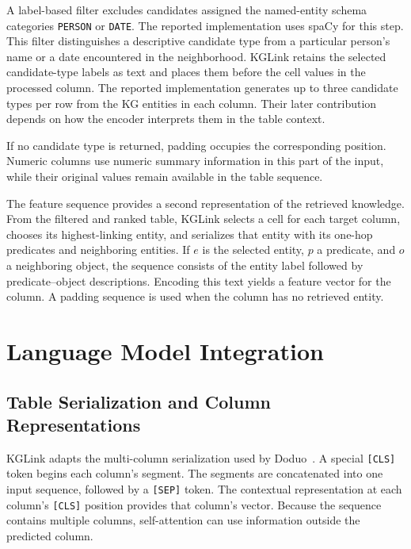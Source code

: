 A label-based filter excludes candidates assigned the named-entity schema categories \texttt{PERSON} or \texttt{DATE}. The reported implementation uses spaCy for this step. This filter distinguishes a descriptive candidate type from a particular person's name or a date encountered in the neighborhood. KGLink retains the selected candidate-type labels as text and places them before the cell values in the processed column. The reported implementation generates up to three candidate types per row from the KG entities in each column. Their later contribution depends on how the encoder interprets them in the table context.

If no candidate type is returned, padding occupies the corresponding position. Numeric columns use numeric summary information in this part of the input, while their original values remain available in the table sequence.

The feature sequence provides a second representation of the retrieved knowledge. From the filtered and ranked table, KGLink selects a cell for each target column, chooses its highest-linking entity, and serializes that entity with its one-hop predicates and neighboring entities. If $e$ is the selected entity, $p$ a predicate, and $o$ a neighboring object, the sequence consists of the entity label followed by predicate--object descriptions. Encoding this text yields a feature vector for the column. A padding sequence is used when the column has no retrieved entity.

\section{Language Model Integration}
\label{sec:kglink:language-model}

\subsection{Table Serialization and Column Representations}
\label{sec:kglink:serialization}

KGLink adapts the multi-column serialization used by Doduo~\cite{kglink-suhara2022annotating}. A special \texttt{[CLS]} token begins each column's segment. The segments are concatenated into one input sequence, followed by a \texttt{[SEP]} token. The contextual representation at each column's \texttt{[CLS]} position provides that column's vector. Because the sequence contains multiple columns, self-attention can use information outside the predicted column.

